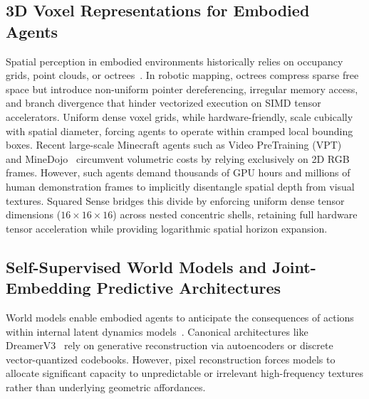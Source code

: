 \documentclass{svproc}
\begin{document}
\subsection{3D Voxel Representations for Embodied Agents}
Spatial perception in embodied environments historically relies on occupancy grids, point clouds, or octrees~\cite{ha2018worldmodels,wang2023voyager}. In robotic mapping, octrees compress sparse free space but introduce non-uniform pointer dereferencing, irregular memory access, and branch divergence that hinder vectorized execution on SIMD tensor accelerators. Uniform dense voxel grids, while hardware-friendly, scale cubically with spatial diameter, forcing agents to operate within cramped local bounding boxes. Recent large-scale Minecraft agents such as Video PreTraining (VPT)~\cite{baker2022vpt} and MineDojo~\cite{fan2022minedojo} circumvent volumetric costs by relying exclusively on 2D RGB frames. However, such agents demand thousands of GPU hours and millions of human demonstration frames to implicitly disentangle spatial depth from visual textures. Squared Sense bridges this divide by enforcing uniform dense tensor dimensions ($16\times16\times16$) across nested concentric shells, retaining full hardware tensor acceleration while providing logarithmic spatial horizon expansion.

\subsection{Self-Supervised World Models and Joint-Embedding Predictive Architectures}
World models enable embodied agents to anticipate the consequences of actions within internal latent dynamics models~\cite{ha2018worldmodels,hafner2023dreamerv3}. Canonical architectures like DreamerV3~\cite{hafner2023dreamerv3} rely on generative reconstruction via autoencoders or discrete vector-quantized codebooks. However, pixel reconstruction forces models to allocate significant capacity to unpredictable or irrelevant high-frequency textures rather than underlying geometric affordances. 
\end{document}
